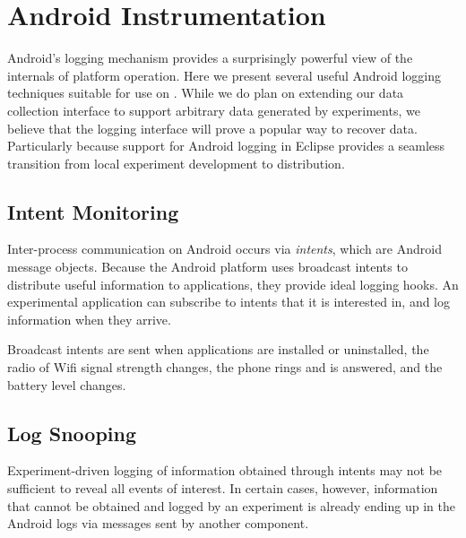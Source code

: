 \section{Android Instrumentation}
\label{sec-logging}


Android's logging mechanism provides a surprisingly powerful view of the
internals of platform operation. 
Here we present several useful Android logging techniques suitable for use on
\PhoneLab{}. While we do plan on extending our data collection interface to
support arbitrary data generated by experiments, we believe that the logging
interface will prove a popular way to recover data. Particularly because
support for Android logging in Eclipse provides a seamless transition from
local experiment development to \PhoneLab{} distribution.

\subsection{Intent Monitoring}

Inter-process communication on Android occurs via \textit{intents}, which are
Android message objects. Because the Android platform uses broadcast intents
to distribute useful information to applications, they provide ideal logging
hooks. An experimental application can subscribe to intents that it is
interested in, and log information when they arrive.

Broadcast intents are sent when applications are installed or uninstalled,
the radio of Wifi signal strength changes, the phone rings and is answered,
and the battery level changes. %

\subsection{Log Snooping}

Experiment-driven logging of information obtained through intents may not be
sufficient to reveal all events of interest. In certain cases, however,
information that cannot be obtained and logged by an experiment is already
ending up in the Android logs via messages sent by another component. 

